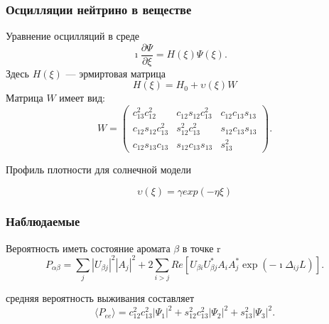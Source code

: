 \documentclass[utf8,9pt,mathserif,usepdftitle=false]{beamer}
\begin{document}
\begin{frame}
  \frametitle{Осцилляции нейтрино в веществе}%
  Уравнение осцилляций в среде
  \begin{equation*}
  	\imath \frac{\partial \Psi}{\partial \xi}=H(\xi)\Psi(\xi).\quad
  \end{equation*}
  Здесь \({H(\xi)}\) — эрмиртовая матрица
  \begin{equation*}
  	H(\xi)=H_0+\upsilon(\xi)W
  \end{equation*}
  Матрица \(W\) имеет вид:
  \begin{equation*}
  	W=
  	\begin{pmatrix}
  		c_{13}^{2}c_{12}^{2} & c_{12}s_{12}c_{13}^{2} & c_{12}c_{13}s_{13}\\
  		c_{12}s_{12}c_{13}^{2} & s_{12}^{2}c_{13}^{2} & s_{12}c_{13}s_{13}\\
  		c_{12}s_{13}c_{13} & s_{12}c_{13}s_{13} & s_{13}^{2}
  	\end{pmatrix}.
  \end{equation*}

  Профиль плотности для солнечной модели
  
  \begin{equation*}
  	\upsilon(\xi)=\gamma exp(-\eta\xi)
  \end{equation*}
  

\end{frame}

\begin{frame}
  \frametitle{Наблюдаемые}%
  Вероятность иметь состояние аромата \(\beta\) в точке r
  \begin{equation*}
  	P_{\alpha\beta}=\sum_{j}|U_{\beta j}|^{2}|A_{j}|^{2}+2\sum_{i>j}Re[U_{\beta i}U_{\beta j}^{*}A_{i}A_{j}^{*}\exp(-\imath\Delta_{ij}L)].
  \end{equation*}
  
  средняя вероятность выживания составляет
  \begin{equation}
  	\langle P_{ee} \rangle=c_{12}^{2}c_{13}^{2}|\Psi_{1}|^{2}+s_{12}^{2}c_{13}^{2}|\Psi_{2}|^{2}+s_{13}^{2}|\Psi_{3}|^{2}.
  \end{equation}
\end{frame}
\end{document}
